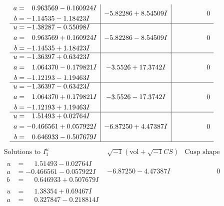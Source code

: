 \documentclass[1p]{elsarticle_modified}
\theoremstyle{definition}
\newcommand{\I}{\sqrt{-1}}
\begin{document}
$$\begin{array}{c|c|c}
\begin{aligned}
a &= \phantom{-}0.963569 - 0.160924 I \\
b &= -1.14535 - 1.18423 I\end{aligned}
 & -5.82286 + 8.54509 I & \phantom{-0.000000 } 0 \\ \hline\begin{aligned}
u &= -1.38287 - 0.55098 I \\
a &= \phantom{-}0.963569 + 0.160924 I \\
b &= -1.14535 + 1.18423 I\end{aligned}
 & -5.82286 - 8.54509 I & \phantom{-0.000000 } 0 \\ \hline\begin{aligned}
u &= -1.36397 + 0.63423 I \\
a &= \phantom{-}1.064370 - 0.179821 I \\
b &= -1.12193 - 1.19463 I\end{aligned}
 & -3.5526 + 17.3742 I & \phantom{-0.000000 } 0 \\ \hline\begin{aligned}
u &= -1.36397 - 0.63423 I \\
a &= \phantom{-}1.064370 + 0.179821 I \\
b &= -1.12193 + 1.19463 I\end{aligned}
 & -3.5526 - 17.3742 I & \phantom{-0.000000 } 0 \\ \hline\begin{aligned}
u &= \phantom{-}1.51493 + 0.02764 I \\
a &= -0.466561 + 0.057922 I \\
b &= \phantom{-}0.646933 - 0.507679 I\end{aligned}
 & -6.87250 + 4.47387 I & \phantom{-0.000000 } 0\\
 \hline 
 \end{array}$$\newpage$$\begin{array}{c|c|c}  
\text{Solutions to }I^u_{1}& \I (\text{vol} + \sqrt{-1}CS) & \text{Cusp shape}\\
 \hline 
\begin{aligned}
u &= \phantom{-}1.51493 - 0.02764 I \\
a &= -0.466561 - 0.057922 I \\
b &= \phantom{-}0.646933 + 0.507679 I\end{aligned}
 & -6.87250 - 4.47387 I & \phantom{-0.000000 } 0 \\ \hline\begin{aligned}
u &= \phantom{-}1.38354 + 0.69467 I \\
a &= \phantom{-}0.327847 - 0.218814 I \\

\end{aligned}
\end{array}$$
\end{document}
